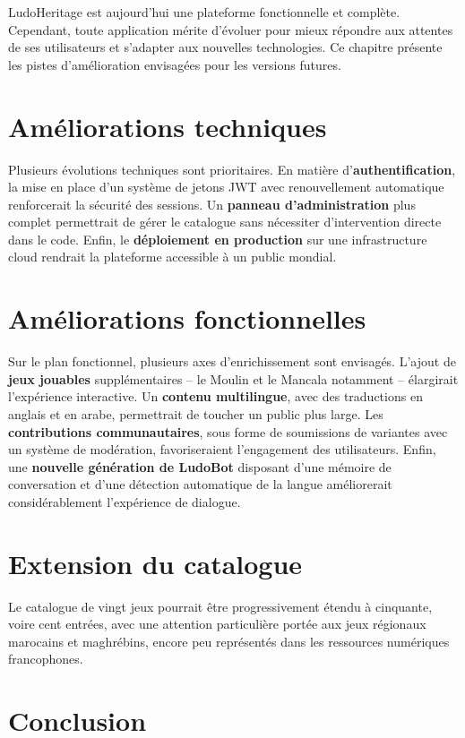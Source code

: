 \documentclass[12pt,a4paper]{report}
\begin{document}
LudoHeritage est aujourd'hui une plateforme fonctionnelle et complète. Cependant, toute
application mérite d'évoluer pour mieux répondre aux attentes de ses utilisateurs et
s'adapter aux nouvelles technologies. Ce chapitre présente les pistes d'amélioration
envisagées pour les versions futures.

\section{Améliorations techniques}

Plusieurs évolutions techniques sont prioritaires. En matière d'\textbf{authentification},
la mise en place d'un système de jetons JWT avec renouvellement automatique renforcerait
la sécurité des sessions. Un \textbf{panneau d'administration} plus complet permettrait
de gérer le catalogue sans nécessiter d'intervention directe dans le code. Enfin, le
\textbf{déploiement en production} sur une infrastructure cloud rendrait la plateforme
accessible à un public mondial.

\section{Améliorations fonctionnelles}

Sur le plan fonctionnel, plusieurs axes d'enrichissement sont envisagés. L'ajout de
\textbf{jeux jouables} supplémentaires -- le Moulin et le Mancala notamment -- élargirait
l'expérience interactive. Un \textbf{contenu multilingue}, avec des traductions en anglais
et en arabe, permettrait de toucher un public plus large. Les \textbf{contributions
communautaires}, sous forme de soumissions de variantes avec un système de modération,
favoriseraient l'engagement des utilisateurs. Enfin, une \textbf{nouvelle génération de
LudoBot} disposant d'une mémoire de conversation et d'une détection automatique de la
langue améliorerait considérablement l'expérience de dialogue.

\section{Extension du catalogue}

Le catalogue de vingt jeux pourrait être progressivement étendu à cinquante, voire cent
entrées, avec une attention particulière portée aux jeux régionaux marocains et
maghrébins, encore peu représentés dans les ressources numériques francophones.

\section{Conclusion}
\end{document}
